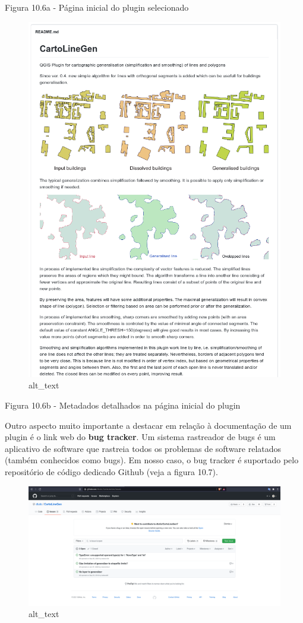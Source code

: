 \documentclass[
]{book}
\begin{document}
Figura 10.6a - Página inicial do plugin selecionado

\begin{figure}
\centering
\includegraphics{media/modulo10/fig106_b.png}
\caption{alt\_text}
\end{figure}

Figura 10.6b - Metadados detalhados na página inicial do plugin

Outro aspecto muito importante a destacar em relação à documentação de um plugin é o link web do \textbf{bug tracker}. Um sistema rastreador de bugs é um aplicativo de software que rastreia todos os problemas de software relatados (também conhecidos como bugs). Em nosso caso, o bug tracker é suportado pelo repositório de código dedicado Github (veja a figura 10.7).

\begin{figure}
\centering
\includegraphics{media/modulo10/fig107.png}
\caption{alt\_text}
\end{figure}
\end{document}
